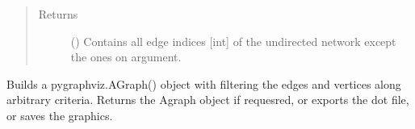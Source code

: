 \documentclass[letterpaper,10pt,english]{sphinxmanual}
\begin{document}
\begin{fulllineitems}
\begin{fulllineitems}
\begin{quote}
\begin{description}
\item[{Returns}] \leavevmode
() \textendash{} Contains all edge indices {[}int{]} of the
undirected network except the ones on  argument.

\end{description}\end{quote}

\end{fulllineitems}


\begin{fulllineitems}
\label{\detokenize{reference:pypath.main.PyPath.export_dot}}
Builds a pygraphviz.AGraph() object with filtering the edges
and vertices along arbitrary criteria.
Returns the Agraph object if requesred, or exports the dot
file, or saves the graphics.


\end{fulllineitems}
\end{fulllineitems}
\end{document}
